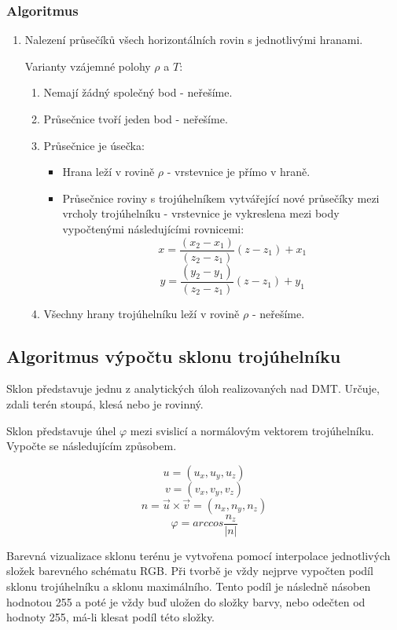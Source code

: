 \documentclass[11pt]{article}
\begin{document}
\subsubsection{Algoritmus}

\begin{enumerate}
\item Nalezení průsečíků všech horizontálních rovin s jednotlivými hranami.

Varianty vzájemné polohy $\rho$ a $T$:
	\begin{enumerate}
		\item Nemají žádný společný bod - neřešíme.
		\item Průsečnice tvoří jeden bod - neřešíme.
		\item Průsečnice je úsečka:
		\begin{itemize}
		\item Hrana leží v rovině $\rho$ - vrstevnice je přímo v hraně.
		\item Průsečnice roviny s trojúhelníkem vytvářející nové průsečíky mezi vrcholy trojúhelníku - vrstevnice je vykreslena mezi body vypočtenými následujícími rovnicemi:
$$  x = \frac{(x_2 - x_1)}{(z_2 - z_1)} (z - z_1) + x_1 $$ 		
$$  y = \frac{(y_2 - y_1)}{(z_2 - z_1)} (z - z_1) + y_1 $$ 
		\end{itemize}
		\item Všechny hrany trojúhelníku leží v rovině $\rho$ - neřešíme.	
	\end{enumerate}

\end{enumerate}
 
\subsection{Algoritmus výpočtu sklonu trojúhelníku}
Sklon představuje jednu z analytických úloh realizovaných nad DMT. Určuje, zdali terén stoupá, klesá nebo je rovinný.

Sklon představuje úhel $ \varphi $ mezi svislicí a normálovým vektorem trojúhelníku. Vypočte se následujícím způsobem.

$$  u = (u_x, u_y, u_z)$$
$$  v = (v_x, v_y, v_z)$$
$$ n = \vec{u}\times \vec{v} = (n_x, n_y, n_z)$$
$$ \varphi = arccos \frac{n_z}{|n|} $$ 

Barevná vizualizace sklonu terénu je vytvořena pomocí interpolace jednotlivých složek barevného schématu RGB. Při tvorbě je vždy nejprve vypočten podíl sklonu trojúhelníku a sklonu maximálního. Tento podíl je následně násoben hodnotou 255 a poté je vždy buď uložen do složky barvy, nebo odečten od hodnoty 255, má-li klesat podíl této složky. 
\end{document}
